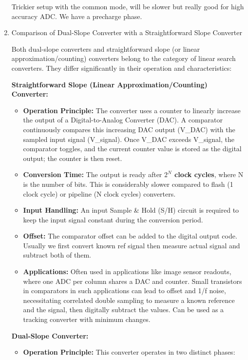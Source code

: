 \documentclass[
  a4paper,
]{article}
\providecommand{\tightlist}{%
  \setlength{\itemsep}{0pt}\setlength{\parskip}{0pt}}
\begin{document}
\begin{enumerate}
  Trickier setup with the common mode, will be slower but really good
  for high accuracy ADC. We have a precharge phase.
\item
  Comparison of Dual-Slope Converter with a Straightforward Slope
  Converter

  Both dual-slope converters and straightforward slope (or linear
  approximation/counting) converters belong to the category of linear
  search converters. They differ significantly in their operation and
  characteristics:

  \textbf{Straightforward Slope (Linear Approximation/Counting)
  Converter:}

  \begin{itemize}
  \tightlist
  \item
    \textbf{Operation Principle:} The converter uses a counter to
    linearly increase the output of a Digital-to-Analog Converter (DAC).
    A comparator continuously compares this increasing DAC output
    (V\_DAC) with the sampled input signal (V\_signal). Once V\_DAC
    exceeds V\_signal, the comparator toggles, and the current counter
    value is stored as the digital output; the counter is then reset.
  \item
    \textbf{Conversion Time:} The output is ready after \textbf{\(2^N\)
    clock cycles}, where N is the number of bits. This is considerably
    slower compared to flash (1 clock cycle) or pipeline (N clock
    cycles) converters.
  \item
    \textbf{Input Handling:} An input Sample \& Hold (S/H) circuit is
    required to keep the input signal constant during the conversion
    period.
  \item
    \textbf{Offset:} The comparator offset can be added to the digital
    output code. Usually we first convert known ref signal then measure
    actual signal and subtract both of them.
  \item
    \textbf{Applications:} Often used in applications like image sensor
    readouts, where one ADC per column shares a DAC and counter. Small
    transistors in comparators in such applications can lead to offset
    and 1/f noise, necessitating correlated double sampling to measure a
    known reference and the signal, then digitally subtract the values.
    Can be used as a tracking converter with minimum changes.
  \end{itemize}

  \textbf{Dual-Slope Converter:}

  \begin{itemize}
  \tightlist
  \item
    \textbf{Operation Principle:} This converter operates in two
    distinct phases:


\end{itemize}
\end{enumerate}
\end{document}
